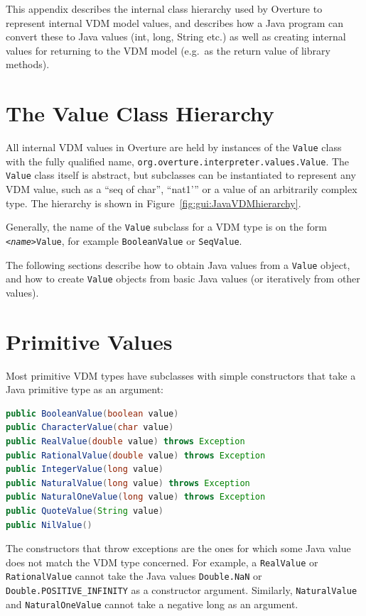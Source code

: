 \documentclass{overturerepchap}
\newcommand{\kw}[1]{{\textbf\ttfamily #1}}
\begin{document}
This appendix describes the internal class hierarchy used by Overture to represent internal VDM model values, and describes how a Java program can convert these to Java values (\kw{int}, \kw{long}, \kw{String} etc.) as well as creating internal values for returning to the VDM model (e.g.\ as the return value of library methods).

\section{The Value Class Hierarchy}

All internal VDM values in Overture are held by instances of the \texttt{Value}
class with the fully qualified name,
\texttt{org.overture.interpreter.values.Value}. The \texttt{Value} class itself
is abstract, but subclasses can be instantiated to represent any VDM value,
such as a ``\kw{seq of char}'', ``\kw{nat1}'” or a value of an arbitrarily
complex type. The hierarchy is shown in Figure~\ref{fig:gui:JavaVDMhierarchy}.

Generally, the name of the \texttt{Value} subclass for a VDM type is on the form \texttt{<\textit{name}>Value}, for example \texttt{BooleanValue} or \texttt{SeqValue}.
 
The following sections describe how to obtain Java values from a \texttt{Value} object, and how to create \texttt{Value} objects from basic Java values (or iteratively from other values).

\section{Primitive Values}

Most primitive VDM types have subclasses with simple constructors that take a Java primitive type as an argument:

\begin{lstlisting}[language=JAVA]
public BooleanValue(boolean value)
public CharacterValue(char value)
public RealValue(double value) throws Exception
public RationalValue(double value) throws Exception
public IntegerValue(long value)
public NaturalValue(long value) throws Exception
public NaturalOneValue(long value) throws Exception
public QuoteValue(String value)
public NilValue()
\end{lstlisting}

The constructors that throw exceptions are the ones for which some Java value does not match the VDM type concerned. For example, a \texttt{RealValue} or \texttt{RationalValue} cannot take the Java values \texttt{Double.NaN} or \texttt{Double.POSITIVE\_INFINITY} as a constructor argument. Similarly, \texttt{NaturalValue} and \texttt{NaturalOneValue} cannot take a negative long as an argument.
\end{document}
